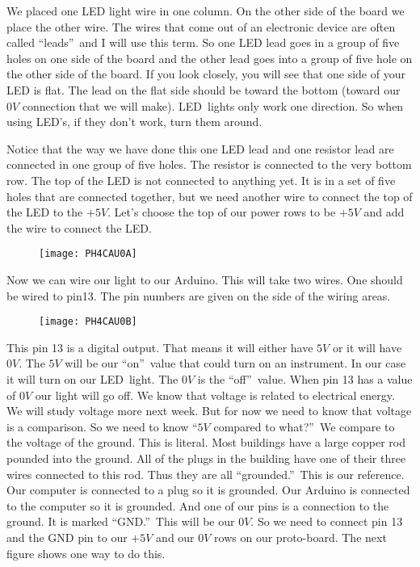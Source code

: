 We placed one LED light wire in one column. On the other side of the board
we place the other wire. The wires that come out of an electronic device are
often called \textquotedblleft leads\textquotedblright\ and I will use this
term. So one LED lead goes in a group of five holes on one side of the board
and the other lead goes into a group of five hole on the other side of the
board. If you look closely, you will see that one side of your LED is flat.
The lead on the flat side should be toward the bottom (toward our $0\unit{V}$
connection that we will make). LED\ lights only work one direction. So when
using LED's, if they don't work, turn them around.

Notice that the way we have done this one LED lead and one resistor lead are
connected in one group of five holes. The resistor is connected to the very
bottom row. The top of the LED is not connected to anything yet. It is in a
set of five holes that are connected together, but we need another wire to
connect the top of the LED to the $+5\unit{V}.$ Let's choose the top of our
power rows to be $+5\unit{V}$ and add the wire to connect the LED. \begin{figure}[h!]
\texttt{[image: PH4CAU0A]}
\end{figure}

Now we can wire our light to our Arduino. This will take two wires. One
should be wired to pin13. The pin numbers are given on the side of the
wiring areas. \begin{figure}[h!]
\texttt{[image: PH4CAU0B]}
\end{figure}This pin 13 is a digital output.
That means it will either have $5\unit{V}$ or it will have $0\unit{V}.$ The $%
5\unit{V}$ will be our \textquotedblleft on\textquotedblright\ value that
could turn on an instrument. In our case it will turn on our LED\ light. The 
$0\unit{V}$ is the \textquotedblleft off\textquotedblright\ value. When pin
13 has a value of $0\unit{V}$ our light will go off. We know that voltage is
related to electrical energy. We will study voltage more next week. But for
now we need to know that voltage is a comparison. So we need to know
\textquotedblleft $5\unit{V}$ compared to what?\textquotedblright\ We
compare to the voltage of the ground. This is literal. Most buildings have a
large copper rod pounded into the ground. All of the plugs in the building
have one of their three wires connected to this rod. Thus they are all
\textquotedblleft grounded.\textquotedblright\ This is our reference. Our
computer is connected to a plug so it is grounded. Our Arduino is connected
to the computer so it is grounded. And one of our pins is a connection to
the ground. It is marked \textquotedblleft GND.\textquotedblright\ This will
be our $0\unit{V}.$ So we need to connect pin 13 and the GND pin to our $+5%
\unit{V}$ and our $0\unit{V}$ rows on our proto-board. The next figure shows
one way to do this.

